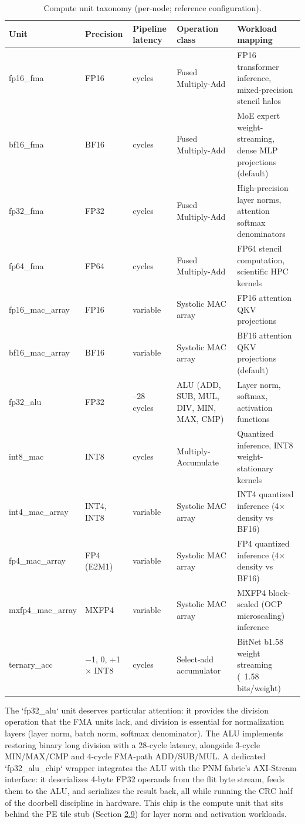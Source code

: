 \documentclass[12pt,onecolumn]{article}
\begin{document}
\begin{table}[t]
\centering
\footnotesize
\caption{Compute unit taxonomy (per-node; reference configuration).}\label{tab:5}
\begin{tabularx}{\textwidth}{>{\hsize=0.5346\hsize}X>{\hsize=0.8491\hsize}X>{\hsize=0.5031\hsize}X>{\hsize=1.2264\hsize}X>{\hsize=1.8868\hsize}X}
\toprule
Unit & Precision & Pipeline latency & Operation class & Workload mapping \\
\midrule
fp16\_fma & FP16 & 3 cycles & Fused Multiply-Add & FP16 transformer inference, mixed-precision stencil halos \\
bf16\_fma & BF16 & 3 cycles & Fused Multiply-Add & MoE expert weight-streaming, dense MLP projections (default) \\
fp32\_fma & FP32 & 3 cycles & Fused Multiply-Add & High-precision layer norms, attention softmax denominators \\
fp64\_fma & FP64 & 3 cycles & Fused Multiply-Add & FP64 stencil computation, scientific HPC kernels \\
fp16\_mac\_array & FP16 & variable & Systolic MAC array & FP16 attention QKV projections \\
bf16\_mac\_array & BF16 & variable & Systolic MAC array & BF16 attention QKV projections (default) \\
fp32\_alu & FP32 & 3--28 cycles & ALU (ADD, SUB, MUL, DIV, MIN, MAX, CMP) & Layer norm, softmax, activation functions \\
int8\_mac & INT8 & 2 cycles & Multiply-Accumulate & Quantized inference, INT8 weight-stationary kernels \\
int4\_mac\_array & INT4, INT8 & variable & Systolic MAC array & INT4 quantized inference (4$\times$ density vs BF16) \\
fp4\_mac\_array & FP4 (E2M1) & variable & Systolic MAC array & FP4 quantized inference (4$\times$ density vs BF16) \\
mxfp4\_mac\_array & MXFP4 & variable & Systolic MAC array & MXFP4 block-scaled (OCP microscaling) inference \\
ternary\_acc & {$-$1, 0, +1} $\times$ INT8 & 3 cycles & Select-add accumulator & BitNet b1.58 weight streaming (~1.58 bits/weight) \\
\bottomrule
\end{tabularx}
\end{table}


The `fp32\_alu` unit deserves particular attention: it provides the division operation that the FMA units lack, and division is essential for normalization layers (layer norm, batch norm, softmax denominator). The ALU implements restoring binary long division with a 28-cycle latency, alongside 3-cycle MIN/MAX/CMP and 4-cycle FMA-path ADD/SUB/MUL. A dedicated `fp32\_alu\_chip` wrapper integrates the ALU with the PNM fabric's AXI-Stream interface: it deserializes 4-byte FP32 operands from the flit byte stream, feeds them to the ALU, and serializes the result back, all while running the CRC half of the doorbell discipline in hardware. This chip is the compute unit that sits behind the PE tile stub (Section \hyperref[sec:2.9]{2.9}) for layer norm and activation workloads.
\end{document}

